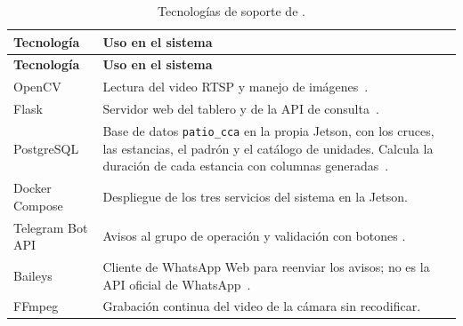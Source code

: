\begin{longtable}{@{}L{3.4cm}L{10.6cm}@{}}
  \caption{Tecnologías de soporte de \saru{}.}
  \label{tab:tecnologias} \\
  \toprule
  \textbf{Tecnología} & \textbf{Uso en el sistema} \\
  \midrule
  \endfirsthead
  \toprule
  \textbf{Tecnología} & \textbf{Uso en el sistema} \\
  \midrule
  \endhead
  OpenCV & Lectura del video RTSP y manejo de imágenes~\cite{opencv}. \\
  Flask & Servidor web del tablero y de la API de consulta~\cite{flask}. \\
  PostgreSQL & Base de datos \texttt{patio\_cca} en la propia Jetson, con
    los cruces, las estancias, el padrón y el catálogo de unidades. Calcula
    la duración de cada estancia con columnas generadas~\cite{postgresql}. \\
  Docker Compose & Despliegue de los tres servicios del sistema en la
    Jetson. \\
  Telegram Bot API & Avisos al grupo de operación y validación con botones
    \cite{telegram}. \\
  Baileys & Cliente de WhatsApp Web para reenviar los avisos; no es la API
    oficial de WhatsApp~\cite{baileys}. \\
  FFmpeg & Grabación continua del video de la cámara sin recodificar. \\
  \bottomrule
\end{longtable}
